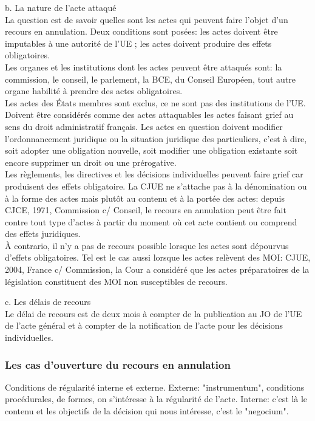 \documentclass[10pt, a4paper, openany]{book}
\begin{document}
b. La nature de l'acte attaqué \\
La question est de savoir quelles sont les actes qui peuvent faire l'objet d'un recours en annulation. Deux conditions sont posées: les actes doivent être imputables à une autorité de l'UE ; les actes doivent produire des effets obligatoires. \\
Les organes et les institutions dont les actes peuvent être attaqués sont: la commission, le conseil, le parlement, la BCE, du Conseil Européen, tout autre organe habilité à prendre des actes obligatoires. \\
Les actes des États membres sont exclus, ce ne sont pas des institutions de l'UE. \\
Doivent être considérés comme des actes attaquables les actes faisant grief au sens du droit administratif français. Les actes en question doivent modifier l'ordonnancement juridique ou la situation juridique des particuliers, c'est à dire, soit adopter une obligation nouvelle, soit modifier une obligation existante soit encore supprimer un droit ou une prérogative. \\
Les règlements, les directives et les décisions individuelles peuvent faire grief car produisent des effets obligatoire. La CJUE ne s'attache pas à la dénomination ou à la forme des actes mais plutôt au contenu et à la portée des actes: depuis CJCE, 1971, Commission c/ Conseil, le recours en annulation peut être fait contre tout type d'actes à partir du moment où cet acte contient ou comprend des effets juridiques. \\
À contrario, il n'y a pas de recours possible lorsque les actes sont dépourvus d'effets obligatoires. Tel est le cas aussi lorsque les actes relèvent des MOI: CJUE, 2004, France c/ Commission, la Cour a considéré que les actes préparatoires de la législation constituent des MOI non susceptibles de recours.


c. Les délais de recours \\
Le délai de recours est de deux mois à compter de la publication au JO de l'UE de l'acte général et à compter de la notification de l'acte pour les décisions individuelles.

\subsubsection{Les cas d'ouverture du recours en annulation}

Conditions de régularité interne et externe. Externe: "instrumentum", conditions procédurales, de formes, on s'intéresse à la régularité de l'acte. Interne: c'est là le contenu et les objectifs de la décision qui nous intéresse, c'est le "negocium". 
\end{document}
